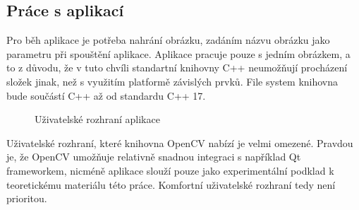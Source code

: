\documentclass[czech, master, public, dept460, male, cpdeclaration, oneside]{diploma}
\begin{document}
\subsection{Práce s aplikací}
Pro běh aplikace je potřeba nahrání obrázku, zadáním názvu obrázku jako parametru při spouštění aplikace. Aplikace pracuje pouze s jedním obrázkem, a to z důvodu, že v tuto chvíli standartní knihovny C++ neumožňují procházení složek jinak, než s využitím platformě závislých prvků. File system knihovna bude součástí C++ až od standardu C++ 17. \par
\begin{figure}[H]
	\centering	
	\caption{Uživatelské rozhraní aplikace}
\end{figure}
\noindent
Uživatelské rozhraní, které knihovna OpenCV nabízí je velmi omezené. Pravdou je, že OpenCV umožňuje relativně snadnou integraci s například Qt frameworkem, nicméně aplikace slouží pouze jako experimentální podklad k teoretickému materiálu této práce. Komfortní uživatelské rozhraní tedy není prioritou. \par
\end{document}
